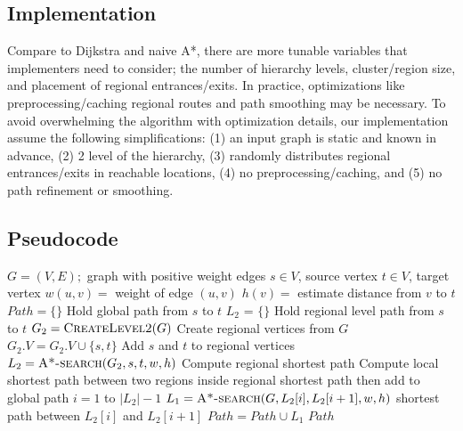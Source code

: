 \documentclass{article}
\begin{document}
\subsection{Implementation}
Compare to Dijkstra and naive A*, there are more tunable variables that implementers need to consider; the number of hierarchy levels, cluster/region size, and placement of regional entrances/exits. In practice, optimizations like preprocessing/caching regional routes and path smoothing may be necessary.
To avoid overwhelming the algorithm with optimization details, our implementation assume the following simplifications: (1) an input graph is static and known in advance, (2) 2 level of the hierarchy, (3) randomly distributes regional entrances/exits in reachable locations, (4) no preprocessing/caching, and (5) no path refinement or smoothing.


\subsection{Pseudocode}
\begin{codebox}
\li \Comment $G = (V,E);$ graph with positive weight edges
\li \Comment $s \in V$, source vertex
\li \Comment $t \in V$, target vertex
\li \Comment $w(u,v) = $ weight of edge $(u,v)$
\li \Comment $h(v) = $ estimate distance from $v$ to $t$  
\li
\li $Path = \{\}$   \hspace{3cm}\Comment Hold global path from $s$ to $t$
\li $L_2$ = $\{\}$  \hspace{3.4cm}\Comment Hold regional level path from $s$ to $t$ 
\li $G_2 = \textsc{CreateLevel2}(G)$ \hspace{0.7cm}\Comment Create regional vertices from $G$
\li $G_2.V = G_2.V \cup \{s, t\}$   \hspace{1.4cm}\Comment Add $s$ and $t$ to regional vertices
\li
\li $L_2 = \textsc{A*-search}(G_2,s,t,w,h)$     \hspace{0.5cm}\Comment Compute regional shortest path
\li
\li \Comment Compute local shortest path between two regions inside regional shortest path
\li \Comment then add to global path
\li \For $i = 1$ to $|L_2| - 1$
\li     \Do
            $L_1 = \textsc{A*-search}(G,L_2[i],L_2[i+1],w,h)$ \hspace{0.5cm}\Comment shortest path between $L_2[i]$ and $L_2[i+1]$
\li         $Path = Path \cup L_1$
        \End
\li 
\li \Return $Path$
\end{codebox}

\medskip
 


 
\end{document}
